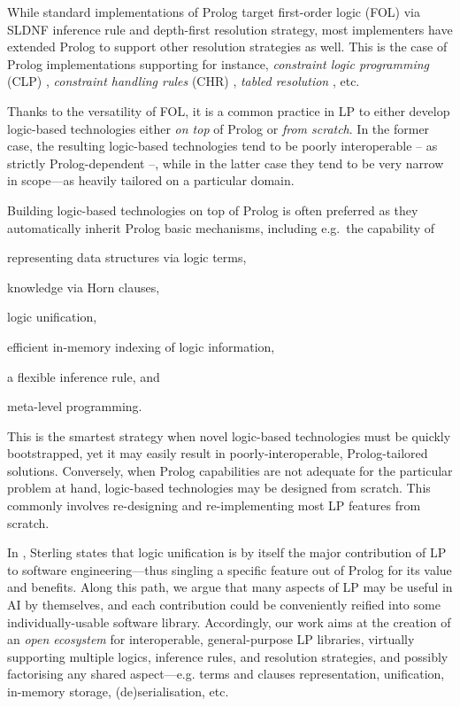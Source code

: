 \documentclass[12pt,a4paper,openright,twoside]{book}
\begin{document}
While standard implementations of Prolog target first-order logic (FOL) via SLDNF inference rule \cite{robinson1965,Kowalski1974,Clark77} and depth-first resolution strategy, most implementers have extended Prolog to support other resolution strategies as well.
%
This is the case of Prolog implementations supporting for instance, \emph{constraint logic programming} (CLP) \cite{jaffar1987}, \emph{constraint handling rules} (CHR) \cite{Fruhwirth98}, \emph{tabled resolution} \cite{SwiftW12}, etc.

Thanks to the versatility of FOL, it is a common practice in LP to either develop logic-based technologies either \emph{on top} of Prolog or \emph{from scratch}.
%
In the former case, the resulting logic-based technologies tend to be poorly interoperable -- as strictly Prolog-dependent \cite{kotlindsi4prolog-woa2020} --, while in the latter case they tend to be very narrow in scope---as heavily tailored on a particular domain.

Building logic-based technologies on top of Prolog is often preferred as they automatically inherit Prolog basic mechanisms, including e.g.\ the capability of
%
\begin{inlinelist}
    \item representing data structures via logic terms,
    \item knowledge via Horn clauses,
    \item logic unification,
    \item efficient in-memory indexing of logic information,
    \item a flexible inference rule, and
    \item meta-level programming.
\end{inlinelist}
%
This is the smartest strategy when novel logic-based technologies must be quickly bootstrapped, yet it may easily result in poorly-interoperable, Prolog-tailored solutions.
%
Conversely, when Prolog capabilities are not adequate for the particular problem at hand, logic-based technologies may be designed from scratch.
%
This commonly involves re-designing and re-implementing most LP features from scratch.

In \cite{Sterling1996}, Sterling states that logic unification is by itself the major contribution of LP to software engineering---thus singling a specific feature out of Prolog for its value and benefits.
%
Along this path, we argue that many aspects of LP may be useful in AI by themselves, and each contribution could be conveniently reified into some individually-usable software library.
%
Accordingly, our work aims at the creation of an \emph{open ecosystem} for interoperable, general-purpose LP libraries, virtually supporting multiple logics, inference rules, and resolution strategies, and possibly factorising any shared aspect---e.g. terms and clauses representation, unification, in-memory storage, (de)serialisation, etc.
\end{document}
